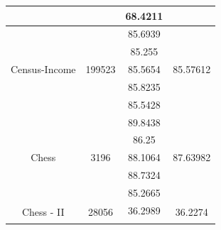 \documentclass[12pt]{article}
\begin{document}
\begin{table}[]
\begin{tabular}{|c|c|c|c|}
		&                         & 68.4211                                                                                          &                             \\ \hline
		\multirow{5}{*}{Census-Income}       & \multirow{5}{*}{199523} & 85.6939                                                                                          & \multirow{5}{*}{85.57612}   \\ \cline{3-3}
		&                         & 85.255                                                                                           &                             \\ \cline{3-3}
		&                         & 85.5654                                                                                          &                             \\ \cline{3-3}
		&                         & 85.8235                                                                                          &                             \\ \cline{3-3}
		&                         & 85.5428                                                                                          &                             \\ \hline
		\multirow{5}{*}{Chess}               & \multirow{5}{*}{3196}   & 89.8438                                                                                          & \multirow{5}{*}{87.63982}   \\ \cline{3-3}
		&                         & 86.25                                                                                            &                             \\ \cline{3-3}
		&                         & 88.1064                                                                                          &                             \\ \cline{3-3}
		&                         & 88.7324                                                                                          &                             \\ \cline{3-3}
		&                         & 85.2665                                                                                          &                             \\ \hline
		\multirow{5}{*}{Chess - II}          & \multirow{5}{*}{28056}  & 36.2989                                                                                          & \multirow{5}{*}{36.2274}    \\ \cline{3-3}

\end{tabular}
\end{table}
\end{document}
